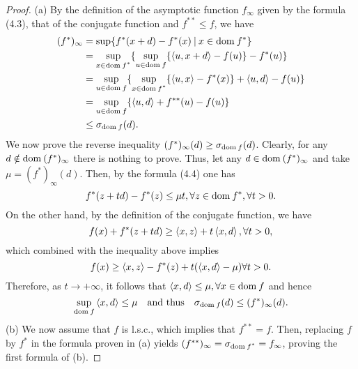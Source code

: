 \documentclass[a4paper,11pt, oneside]{book}
\theoremstyle{definition}
\newcommand{\Domain}[1]{\text{\rm dom\:${#1}$}} %
\newcommand{\InnerProduct}[2]{\left\langle {#1},{#2}\right\rangle} %
\newcommand{\ConjugateFunction}[1]{{#1}^*}
\newcommand{\SupportFunction}[1]{\sigma_{#1}}
\begin{document}
\begin{proof}
  (a) By the definition of the asymptotic function $f_{\infty}$ given by the formula (4.3), that of the conjugate function and $f^{**} \leq f$, we have
  \begin{equation}
    \begin{split}
      (\ConjugateFunction{f})_{\infty} &= \sup \{ \ConjugateFunction{f}(x+d) - \ConjugateFunction{f}(x) \:|\: x \in \Domain{\ConjugateFunction{f}} \} \\
      &= \sup_{x \in \Domain{\ConjugateFunction{f}}}\{ \sup_{u \in \Domain{f}} \{ \InnerProduct{u}{x+d} - f(u) \} -\ConjugateFunction{f}(u) \} \\
      &= \sup_{u \in \Domain{f}} \{ \sup_{x \in \Domain{\ConjugateFunction{f}}} \{ \InnerProduct{u}{x} - \ConjugateFunction{f}(x) \} + \InnerProduct{u}{d} - f(u) \} \\
      &= \sup_{u \in \Domain{f}} \{ \InnerProduct{u}{d} + f^{**}(u) - f(u) \} \\
      &\leq \SupportFunction{\Domain{f}}(d). \notag
    \end{split}
  \end{equation}
  We now prove the reverse inequality $(\ConjugateFunction{f})_{\infty}(d) \geq \SupportFunction{\Domain{f}}(d)$. Clearly, for any $d \notin \Domain{(\ConjugateFunction{f})_{\infty}}$ there is nothing to prove. Thus, let any $d \in \Domain{(\ConjugateFunction{f})_{\infty}}$ and take $\mu = (\ConjugateFunction{f})_{\infty}(d)$. Then, by the formula (4.4) one has
  \begin{equation}
    \ConjugateFunction{f}(z+td) - \ConjugateFunction{f}(z) \leq \mu t, \forall z \in \Domain{\ConjugateFunction{f}}, \forall t>0. \notag
  \end{equation}
  On the other hand, by the definition of the conjugate function, we have
  \begin{equation}
    f(x) + \ConjugateFunction{f}(z+td) \geq \InnerProduct{x}{z} + t\InnerProduct{x}{d},\forall t>0, \notag
  \end{equation}
  which combined with the inequality above implies
  \begin{equation}
    f(x) \geq \InnerProduct{x}{z} - \ConjugateFunction{f}(z) + t(\InnerProduct{x}{d} - \mu) \forall t>0. \notag
  \end{equation}
  Therefore, as $t \to +\infty$, it follows that $\InnerProduct{x}{d}\leq\mu, \forall x \in \Domain{f}$ and hence
  \begin{equation}
    \sup_{\Domain{f}} \InnerProduct{x}{d} \leq \mu \quad \text{and thus} \quad \SupportFunction{\Domain{f}}(d) \leq (\ConjugateFunction{f})_{\infty}(d). \notag
  \end{equation}
  (b) We now assume that $f$ is l.s.c., which implies that $f^{**}= f$. Then, replacing $f$ by $\ConjugateFunction{f}$ in the formula proven in (a) yields $(f^{**})_{\infty} = \SupportFunction{\Domain{\ConjugateFunction{f}}} = f_{\infty}$, proving the first formula of (b).


\end{proof}
\end{document}
